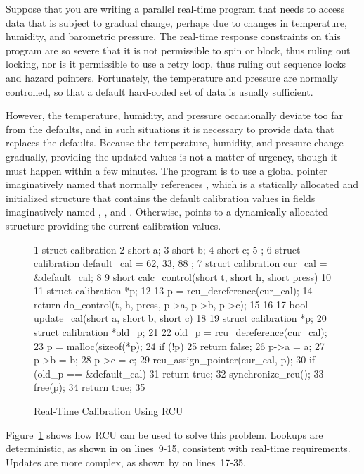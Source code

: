Suppose that you are writing a parallel real-time program that needs
to access
data that is subject to gradual change, perhaps due to changes in
temperature, humidity, and barometric pressure.
The real-time response constraints on this program are so severe that
it is not permissible to spin or block, thus ruling out locking,
nor is it permissible to use a retry loop, thus ruling out sequence locks
and hazard pointers.
Fortunately, the temperature and pressure are normally controlled,
so that a default hard-coded set of data is usually sufficient.

However, the temperature, humidity, and pressure occasionally deviate too far
from the defaults, and in such situations it is necessary to provide
data that replaces the defaults.
Because the temperature, humidity, and pressure change gradually,
providing the updated values is not a matter of urgency, though
it must happen within a few minutes.
The program is to use a global pointer imaginatively named 
that normally references , which is a statically allocated
and initialized structure that contains the default calibration values
in fields imaginatively named , , and .
Otherwise,  points to a dynamically allocated
structure providing the current calibration values.

\begin{figure}[tb]
{ \scriptsize
\begin{verbbox}
 1 struct calibration {
 2   short a;
 3   short b;
 4   short c;
 5 };
 6 struct calibration default_cal = { 62, 33, 88 };
 7 struct calibration cur_cal = &default_cal;
 8
 9 short calc_control(short t, short h, short press)
10 {
11   struct calibration *p;
12
13   p = rcu_dereference(cur_cal);
14   return do_control(t, h, press, p->a, p->b, p->c);
15 }
16
17 bool update_cal(short a, short b, short c)
18 {
19   struct calibration *p;
20   struct calibration *old_p;
21
22   old_p = rcu_dereference(cur_cal);
23   p = malloc(sizeof(*p);
24   if (!p)
25     return false;
26   p->a = a;
27   p->b = b;
28   p->c = c;
29   rcu_assign_pointer(cur_cal, p);
30   if (old_p == &default_cal)
31     return true;
32   synchronize_rcu();
33   free(p);
34   return true;
35 }
\end{verbbox}
}
\centering
\theverbbox
\caption{Real-Time Calibration Using RCU}
\label{fig:rt:Real-Time Calibration Using RCU}
\end{figure}

Figure~\ref{fig:rt:Real-Time Calibration Using RCU}
shows how RCU can be used to solve this problem.
Lookups are deterministic, as shown in 
on lines~9-15, consistent with real-time requirements.
Updates are more complex, as shown by 
on lines~17-35.

